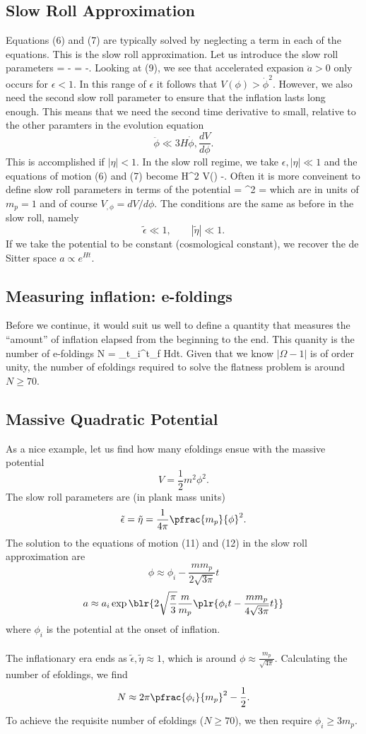 \documentclass[10pt,letterpaper]{article}
\begin{document}
\subsection{Slow Roll Approximation}
Equations (6) and (7) are typically solved by neglecting a term in each of the equations. This is the slow roll approximation. Let us introduce the slow roll parameters
\be
	\epsilon = -
\ee
\be
	\eta = -.
\ee
Looking at (9), we see that accelerated expasion $\ddot a>0$ only occurs for $\epsilon < 1$. In this range of $\epsilon$ it follows that $V(\phi)> \dot\phi^2$. However, we also need the second slow roll parameter to ensure that the inflation lasts long enough. This means that we need the second time derivative to small, relative to the other paramters in the evolution equation
\[
	\ddot \phi \ll 3H\dot\phi, \frac{dV}{d\phi}.
\]
This is accomplished if $|\eta| < 1$. In the slow roll regime, we take $\epsilon,|\eta|\ll 1$ and the equations of motion (6) and (7) become
\be
	H^2 \approx {} V(\phi)
\ee
\be
	\dot\phi \approx -.
\ee
Often it is more conveinent to define slow roll parameters in terms of the potential
\be
	\tilde\epsilon =  ^2
\ee
\be
	\tilde\eta = 
\ee
which are in units of $m_p = 1$ and of course $V_{,\phi} = dV/d\phi$. The conditions are the same as before in the slow roll, namely
\[
	\tilde \epsilon \ll 1,\qquad |\tilde\eta| \ll1.
\]
If we take the potential to be constant (cosmological constant), we recover the de Sitter space $a\propto e^{Ht}$.
\subsection{Measuring inflation: e-foldings}
Before we continue, it would suit us well to define a quantity that measures the ``amount'' of inflation elapsed from the beginning to the end. This quanity is the number of e-foldings 
\be
	N \equiv \ln {} = \int_{t_i}^{t_f} Hdt.
\ee
Given that we know $|\Omega -1|$ is of order unity, the number of efoldings required to solve the flatness problem is around $N\ge 70$. 
\subsection{Massive Quadratic Potential}
As a nice example, let us find how many efoldings ensue with the massive potential
\[
	V=\frac12 m^2\phi^2. 
\]
The slow roll parameters are (in plank mass units)
\[
	\tilde \epsilon = \tilde \eta = \frac{1}{4\pi}\pfrac{m_p}{\phi}^2.
\]
The solution to the equations of motion (11) and (12) in the slow roll approximation are
\[
	\phi \approx \phi_i-\frac{mm_p}{2\sqrt{3\pi}}t 
\]
\[
	a\approx a_i\exp\blr{2\sqrt\frac\pi3\frac{m}{m_p}\plr{ \phi_it-\frac{mm_p}{4\sqrt{3\pi}}t}}
\] 
where $\phi_i$ is the potential at the onset of inflation. \\ \\
The inflationary era ends as $\tilde \epsilon,\tilde\eta \approx 1$, which is around $\phi \approx \frac{ m_p}{\sqrt{4\pi}}$. Calculating the number of efoldings, we find
\[
	N \approx 2\pi \pfrac{\phi_i}{m_p}^2-\frac12.
\]
To achieve the requisite number of efoldings ($N\ge 70$), we then require $\phi_i \ge 3m_p$.  
\end{document}
